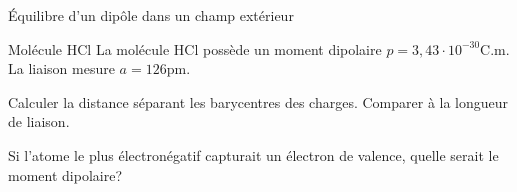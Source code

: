 \begin{exo}[PC][3][TD]{Équilibre d'un dipôle dans un champ extérieur}
{\begin{enumerate}
  \end{enumerate}
  }

\end{exo}

  
  \begin{exo}[PC][1][colle]{Molécule HCl}
  La molécule $\mathrm{HCl}$ possède un moment dipolaire $p=3,43 \cdot 10^{-30} \mathrm{C} . \mathrm{m}$. La liaison mesure $a=126 \mathrm{pm}$.
  \begin{quest}
    \item Calculer la distance séparant les barycentres des charges. Comparer à la longueur de liaison.
    \item Si l'atome le plus électronégatif capturait un électron de valence, quelle serait le moment dipolaire?
  \end{quest}
  \end{exo}
  
